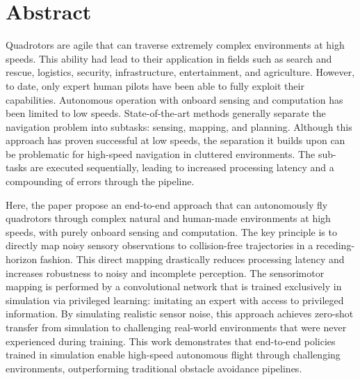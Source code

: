 \chapter*{Abstract}
Quadrotors are agile that can traverse extremely complex environments at high
speeds. This ability had lead to their application in fields such as search and rescue, logistics, security, infrastructure, entertainment, and agriculture.  However, to date, only expert human pilots have been able to fully exploit their capabilities. Autonomous operation with onboard sensing and computation has been limited to low speeds. State-of-the-art methods generally
separate the navigation problem into subtasks: sensing, mapping, and planning. Although this approach has
proven successful at low speeds, the separation it builds upon can be problematic for high-speed navigation in
cluttered environments. The sub-tasks are executed sequentially, leading to increased processing latency and a
compounding of errors through the pipeline.

Here, the paper propose an end-to-end approach that can autonomously
fly quadrotors through complex natural and human-made environments at high speeds, with purely onboard
sensing and computation. The key principle is to directly map noisy sensory observations to collision-free trajectories in a receding-horizon fashion. This direct mapping drastically reduces processing latency and increases
robustness to noisy and incomplete perception. The sensorimotor mapping is performed by a convolutional network that is trained exclusively in simulation via privileged learning: imitating an expert with access to privileged
information. By simulating realistic sensor noise, this approach achieves zero-shot transfer from simulation to
challenging real-world environments that were never experienced during training. This work demonstrates that end-to-end policies trained in
simulation enable high-speed autonomous flight through challenging environments, outperforming traditional
obstacle avoidance pipelines.
